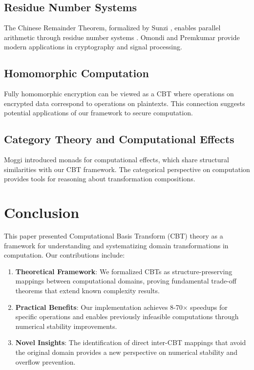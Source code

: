 \documentclass[12pt,a4paper]{article}
\theoremstyle{definition}
\begin{document}
\subsection{Residue Number Systems}

The Chinese Remainder Theorem, formalized by Sunzi \cite{sunzi500}, enables parallel arithmetic through residue number systems \cite{szabo1967residue}. Omondi and Premkumar \cite{omondi2007residue} provide modern applications in cryptography and signal processing.

\subsection{Homomorphic Computation}

Fully homomorphic encryption \cite{gentry2009fully} can be viewed as a CBT where operations on encrypted data correspond to operations on plaintexts. This connection suggests potential applications of our framework to secure computation.

\subsection{Category Theory and Computational Effects}

Moggi \cite{moggi1991notions} introduced monads for computational effects, which share structural similarities with our CBT framework. The categorical perspective on computation \cite{awodey2010category} provides tools for reasoning about transformation compositions.

\section{Conclusion}

This paper presented Computational Basis Transform (CBT) theory as a framework for understanding and systematizing domain transformations in computation. Our contributions include:

\begin{enumerate}
\item \textbf{Theoretical Framework}: We formalized CBTs as structure-preserving mappings between computational domains, proving fundamental trade-off theorems that extend known complexity results.

\item \textbf{Practical Benefits}: Our implementation achieves 8-70× speedups for specific operations and enables previously infeasible computations through numerical stability improvements.

\item \textbf{Novel Insights}: The identification of direct inter-CBT mappings that avoid the original domain provides a new perspective on numerical stability and overflow prevention.
\end{enumerate}
\end{document}
